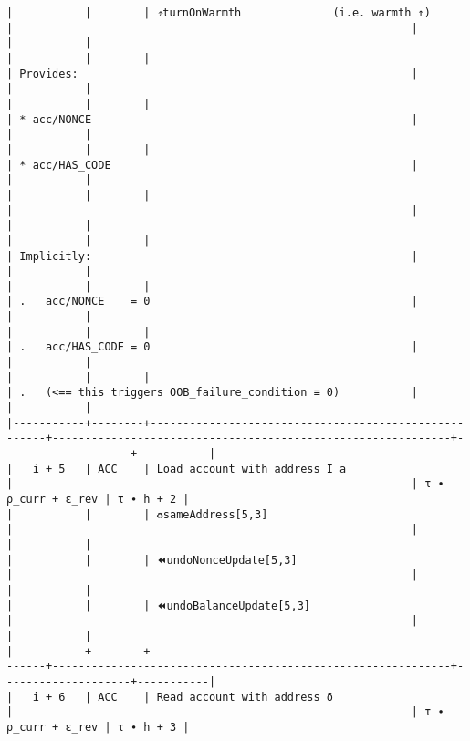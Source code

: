 \documentclass[varwidth=\maxdimen,margin=0.5cm,multi={verbatim}]{standalone}
\begin{document}
\begin{verbatim}
|           |        | ⤴️turnOnWarmth              (i.e. warmth ↑)           |                                                             |                    |           |
|           |        |                                                      | Provides:                                                   |                    |           |
|           |        |                                                      | * acc/NONCE                                                 |                    |           |
|           |        |                                                      | * acc/HAS_CODE                                              |                    |           |
|           |        |                                                      |                                                             |                    |           |
|           |        |                                                      | Implicitly:                                                 |                    |           |
|           |        |                                                      | .   acc/NONCE    = 0                                        |                    |           |
|           |        |                                                      | .   acc/HAS_CODE = 0                                        |                    |           |
|           |        |                                                      | .   (<== this triggers OOB_failure_condition ≡ 0)           |                    |           |
|-----------+--------+------------------------------------------------------+-------------------------------------------------------------+--------------------+-----------|
|   i + 5   | ACC    | Load account with address I_a                        |                                                             | τ ∙ ρ_curr + ε_rev | τ ∙ h + 2 |
|           |        | ♻️sameAddress[5,3]                                    |                                                             |                    |           |
|           |        | ⏪undoNonceUpdate[5,3]                               |                                                             |                    |           |
|           |        | ⏪undoBalanceUpdate[5,3]                             |                                                             |                    |           |
|-----------+--------+------------------------------------------------------+-------------------------------------------------------------+--------------------+-----------|
|   i + 6   | ACC    | Read account with address δ                          |                                                             | τ ∙ ρ_curr + ε_rev | τ ∙ h + 3 |

\end{verbatim}
\end{document}
